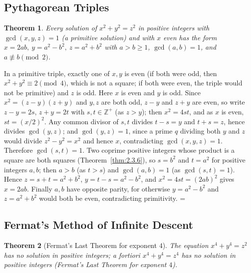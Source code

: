 \documentclass[11pt]{article}
\makeatletter
\theoremstyle{ntstyle}
\newtheorem{theorem}{Theorem}[subsection]
\let\nt@closedisplay\]
\def\nt@guardedclose{\@ifnextchar\par{\nt@closeafterpar}{\@ifnextchar\end{\postdisplaypenalty\@M\nt@closedisplay}{\nt@closedisplay}}}
\def\nt@closeafterpar\par{\@ifnextchar\par{\nt@closeafterpar}{\@ifnextchar\end{\postdisplaypenalty\@M\nt@closedisplay\par}{\nt@closedisplay\par}}}
\renewenvironment{proof}[1][\proofname]{\par
  \pushQED{\qed}\normalfont\topsep\medskipamount\edef\nt@afterproof{\@endparpenalty=\the\@endparpenalty\relax}\@beginparpenalty\@M\@endparpenalty\@M\let\]\nt@guardedclose\trivlist\item[]\textit{#1\@addpunct{.}} \ignorespaces}{\ifvmode\addpenalty\@M\fi\popQED\nt@afterproof\endtrivlist\@endpefalse}
\makeatother
\begin{document}
\subsection{Pythagorean Triples}

\begin{theorem}\label{thm:8.4.1} Every solution of
	$x^2+y^2=z^2$ in positive integers with $\gcd(x,y,z)=1$ (a primitive
	solution) and with $x$ even has the
	form $x=2ab,\ y=a^2-b^2,\ z=a^2+b^2$ with $a>b\ge1$, $\gcd(a, b)=1$, and
	$a\not\equiv b\pmod{2}$.
\end{theorem}

\begin{proof} In a primitive triple, exactly one of $x,y$
	is even (if both were odd, then $x^2+y^2\equiv2\pmod{4}$, which is not a square; if both
	were even, the triple would not be primitive) and $z$ is odd. Here $x$ is even and $y$ is odd.
	Since $x^2=(z-y)(z+y)$ and $y,z$ are both odd, $z-y$ and $z+y$
	are even, so write $z-y=2s$, $z+y=2t$ with $s,t\in\mathbb{Z}^+$ (as
	$z>y$); then $x^2=4st$, and as $x$ is even, $st=(x/2)^2$. Any common
	divisor of $s,t$ divides $t-s=y$ and $t+s=z$, hence divides
	$\gcd(y, z)$; and $\gcd(y, z)=1$, since a prime $q$ dividing both $y$ and
	$z$ would divide $z^2-y^2=x^2$ and hence $x$, contradicting
	$\gcd(x,y,z)=1$. Therefore $\gcd(s, t)=1$. Two coprime positive
	integers whose product is a square are both squares (Theorem~\ref{thm:2.3.6}), so
	$s=b^2$ and $t=a^2$ for positive integers $a,b$; then $a>b$ (as
	$t>s$) and $\gcd(a, b)=1$ (as $\gcd(s, t)=1$). Hence $z=s+t=a^2+b^2$,
	$y=t-s=a^2-b^2$, and $x^2=4st=(2ab)^2$ gives $x=2ab$. Finally $a,b$
	have opposite parity, for otherwise $y=a^2-b^2$ and $z=a^2+b^2$
	would both be even, contradicting primitivity.
\end{proof}
\subsection{Fermat's Method of Infinite Descent}

\begin{theorem}[Fermat's Last Theorem for exponent $4$]\label{thm:8.5.1} The equation
	$x^{4}+y^{4}=z^{2}$ has no solution in positive integers; a fortiori
	$x^{4}+y^{4}=z^{4}$ has no solution in positive integers (Fermat's Last Theorem for exponent $4$).
\end{theorem}
\end{document}
